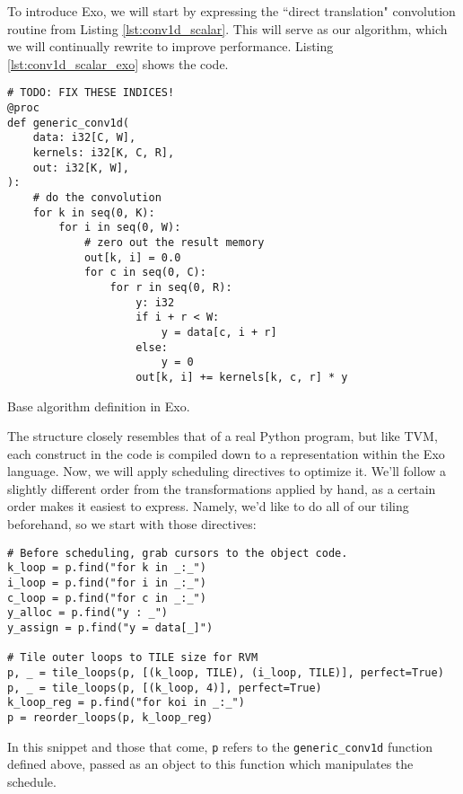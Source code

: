 \documentclass[acmsmall, nonacm=true]{acmart}
\begin{document}
To introduce Exo, we will start by expressing the ``direct translation" convolution routine from Listing \ref{lst:conv1d_scalar}. This will serve as our algorithm, which we will continually rewrite to improve performance. Listing \ref{lst:conv1d_scalar_exo} shows the code. 

\begin{listing}
\centering
\begin{verbatim}
# TODO: FIX THESE INDICES!
@proc
def generic_conv1d(
    data: i32[C, W],
    kernels: i32[K, C, R],
    out: i32[K, W],
):
    # do the convolution
    for k in seq(0, K):
        for i in seq(0, W):
            # zero out the result memory
            out[k, i] = 0.0
            for c in seq(0, C):
                for r in seq(0, R):
                    y: i32
                    if i + r < W:
                        y = data[c, i + r]
                    else:
                        y = 0
                    out[k, i] += kernels[k, c, r] * y
\end{verbatim}
\caption{Base algorithm definition in Exo.}

\label{lst:conv1d_scalar_exo}
\end{listing}

The structure closely resembles that of a real Python program, but like TVM, each construct in the code is compiled down to a representation within the Exo language. Now, we will apply scheduling directives to optimize it. We'll follow a slightly different order from the transformations applied by hand, as a certain order makes it easiest to express. Namely, we'd like to do all of our tiling beforehand, so we start with those directives:

\begin{verbatim}
# Before scheduling, grab cursors to the object code.
k_loop = p.find("for k in _:_")
i_loop = p.find("for i in _:_")
c_loop = p.find("for c in _:_")
y_alloc = p.find("y : _")
y_assign = p.find("y = data[_]")

# Tile outer loops to TILE size for RVM
p, _ = tile_loops(p, [(k_loop, TILE), (i_loop, TILE)], perfect=True)
p, _ = tile_loops(p, [(k_loop, 4)], perfect=True)
k_loop_reg = p.find("for koi in _:_")
p = reorder_loops(p, k_loop_reg)
\end{verbatim}
In this snippet and those that come, \verb|p| refers to the \verb|generic_conv1d| function defined above, passed as an object to this function which manipulates the schedule. 
\end{document}
